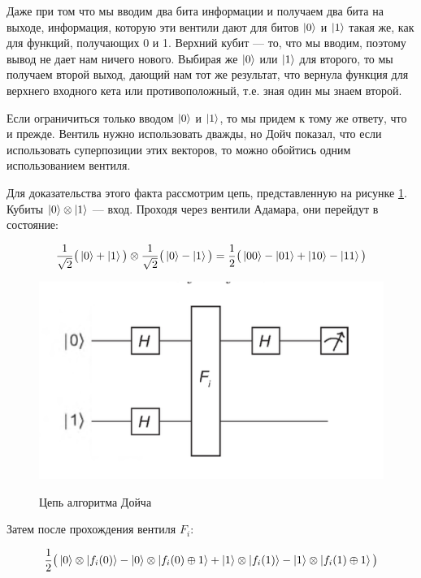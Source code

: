 \documentclass[a4paper, 12pt]{article}
\begin{document}
Даже при том что мы вводим два бита информации и получаем два бита на выходе, информация, которую эти вентили дают для битов $\ket{0}$ и $\ket{1}$ такая же, как для функций, получающих 0 и 1. Верхний кубит --- то, что мы вводим, поэтому вывод не дает нам ничего нового. Выбирая же $\ket{0}$ или $\ket{1}$ для второго, то мы получаем второй выход, дающий нам тот же результат, что вернула функция для верхнего входного кета или противоположный, т.е. зная один мы знаем второй.

Если ограничиться только вводом $\ket{0}$ и $\ket{1}$, то мы придем к тому же ответу, что и прежде. Вентиль нужно использовать дважды, но Дойч показал, что если использовать суперпозиции этих векторов, то можно обойтись одним использованием вентиля.

Для доказательства этого факта рассмотрим цепь, представленную на рисунке \ref{Doice}. Кубиты $\ket{0} \otimes \ket{1}$ --- вход. Проходя через вентили Адамара, они перейдут в состояние:

\begin{equation}
	\frac{1}{\sqrt{2}}\big(\ket{0} + \ket{1}\big) \otimes \frac{1}{\sqrt{2}} \big(\ket{0} - \ket{1}\big) = \frac{1}{2} \big(\ket{00} - \ket{01} + \ket{10} - \ket{11}\big)
\end{equation}

\begin{figure}[H]
	\centering
	\includegraphics[width=0.8\linewidth]{Doice}
	\label{Doice}
	\caption{Цепь алгоритма Дойча}
\end{figure}

Затем после прохождения вентиля $F_i$:

\begin{equation}
	\frac{1}{2}\big(\ket{0} \otimes \ket{f_i(0)} - \ket{0} \otimes \ket{f_i(0) \oplus 1} + \ket{1} \otimes \ket{f_i(1)} - \ket{1} \otimes \ket{f_i(1) \oplus 1} \big)
\end{equation}
\end{document}
